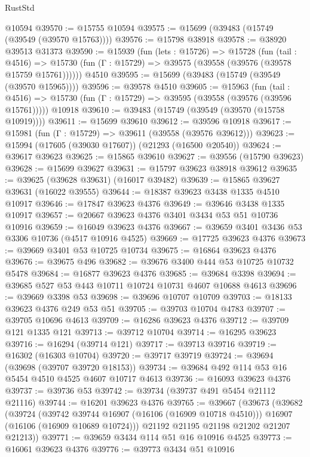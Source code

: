 \begin{lexlean}{RustStd}
\begin{coremodule}
    @10594
@39570 := @15755 @10594
@39575 := @15699 (@39483 (@15749 (@39549 (@39570 @15763))))
@39576 := @15798 @38918
@39578 := @38920 @39513 @31373
@39590 := @15939
    (fun (lets : @15726) =>
    @15728
      (fun (tail : @4516) =>
      @15730 (fun (Γ : @15729) => @39575 (@39558 (@39576 (@39578 @15759 @15761))))))
    @4510
@39595 := @15699 (@39483 (@15749 (@39549 (@39570 @15965))))
@39596 := @39578 @4510
@39605 := @15963
    (fun (tail : @4516) => @15730 (fun (Γ : @15729) => @39595 (@39558 (@39576 (@39596 @15761)))))
    @10918
@39610 := @39483 (@15749 (@39549 (@39570 (@15758 @10919))))
@39611 := @15699 @39610
@39612 := @39596 @10918
@39617 := @15981 (fun (Γ : @15729) => @39611 (@39558 (@39576 @39612)))
@39623 := @15994 (@17605 (@39030 @17607)) (@21293 (@16500 @20540))
@39624 := @39617 @39623
@39625 := @15865 @39610
@39627 := @39556 (@15790 @39623)
@39628 := @15699 @39627
@39631 := @15797 @39623 @38918 @39612
@39635 := @39625 (@39628 @39631) (@16017 @39482)
@39639 := @15865 @39627 @39631 (@16022 @39555)
@39644 := @18387 @39623 @3438 @1335 @4510 @10917
@39646 := @17847 @39623 @4376
@39649 := @39646 @3438 @1335 @10917
@39657 := @20667 @39623 @4376 @3401 @3434 @53 @51 @10736 @10916
@39659 := @16049 @39623 @4376
@39667 := @39659 @3401 @3436 @53 @3306 @10736 (@4517 @10916 @4525)
@39669 := @17725 @39623 @4376
@39673 := @39669 @3401 @53 @10725 @10734
@39675 := @16864 @39623 @4376
@39676 := @39675 @496
@39682 := @39676 @3400 @444 @53 @10725 @10732 @5478
@39684 := @16877 @39623 @4376
@39685 := @39684 @3398
@39694 := @39685 @527 @53 @443 @10711 @10724 @10731 @4607 @10688 @4613
@39696 := @39669 @3398 @53
@39698 := @39696 @10707 @10709
@39703 := @18133 @39623 @4376 @249 @53 @51
@39705 := @39703 @10704 @4783
@39707 := @39705 @10696 @4613
@39709 := @16286 @39623 @4376
@39712 := @39709 @121 @1335 @121
@39713 := @39712 @10704
@39714 := @16295 @39623
@39716 := @16294 (@39714 @121)
@39717 := @39713 @39716
@39719 := @16302 (@16303 @10704)
@39720 := @39717 @39719
@39724 := @39694 (@39698 (@39707 @39720 @18153))
@39734 := @39684 @492 @114 @53 @16 @5454 @4510 @4525 @4607 @10717 @4613
@39736 := @16093 @39623 @4376
@39737 := @39736 @53
@39742 := @39734 (@39737 @491 @5454 @21112 @21116)
@39744 := @16201 @39623 @4376
@39765 := @39667
    (@39673
      (@39682
        (@39724
          (@39742 @39744 @16907 (@16106 (@16909 @10718 @4510)))
          @16907
          (@16106 (@16909 @10689 @10724)))
        @21192
        @21195
        @21198
        @21202
        @21207
        @21213))
@39771 := @39659 @3434 @114 @51 @16 @10916 @4525
@39773 := @16061 @39623 @4376
@39776 := @39773 @3434 @51 @10916

\end{coremodule}
\end{lexlean}
